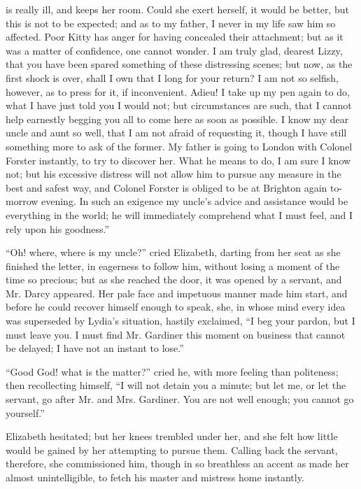 \documentclass[10pt]{book}
\begin{document}
is really ill, and keeps her room. Could she exert herself, it would be
better, but this is not to be expected; and as to my father, I never in
my life saw him so affected. Poor Kitty has anger for having concealed
their attachment; but as it was a matter of confidence, one cannot
wonder. I am truly glad, dearest Lizzy, that you have been spared
something of these distressing scenes; but now, as the first shock is
over, shall I own that I long for your return? I am not so selfish,
however, as to press for it, if inconvenient. Adieu! I take up my pen
again to do, what I have just told you I would not; but circumstances
are such, that I cannot help earnestly begging you all to come here as
soon as possible. I know my dear uncle and aunt so well, that I am not
afraid of requesting it, though I have still something more to ask of
the former. My father is going to London with Colonel Forster instantly,
to try to discover her. What he means to do, I am sure I know not; but
his excessive distress will not allow him to pursue any measure in the
best and safest way, and Colonel Forster is obliged to be at Brighton
again to-morrow evening. In such an exigence my uncle’s advice and
assistance would be everything in the world; he will immediately
comprehend what I must feel, and I rely upon his goodness.”
  

   “Oh! where, where is my uncle?” cried Elizabeth, darting from her seat
as she finished the letter, in eagerness to follow him, without losing a
moment of the time so precious; but as she reached the door, it was
opened
   by a servant, and Mr. Darcy appeared. Her pale face and
impetuous manner made him start, and before he could recover himself
enough to speak, she, in whose mind every idea was superseded by Lydia’s
situation, hastily exclaimed, “I beg your pardon, but I must leave you.
I must find Mr. Gardiner this moment on business that cannot be delayed;
I have not an instant to lose.”
  

   “Good God! what is the matter?” cried he, with more feeling than
politeness; then recollecting himself, “I will not detain you a minute;
but let me, or let the servant, go after Mr. and Mrs. Gardiner. You are
not well enough; you cannot go yourself.”
  

   Elizabeth hesitated; but her knees trembled under her, and she felt how
little would be gained by her attempting to pursue them. Calling back
the servant, therefore, she commissioned him, though in so breathless an
accent as made her almost unintelligible, to fetch his master and
mistress home instantly.
  
\end{document}
